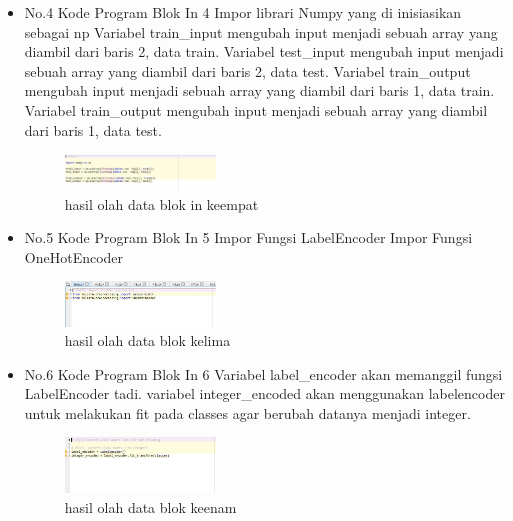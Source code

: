 \begin{enumerate}
\begin{itemize}
        \item  {No.4 Kode Program Blok In 4}
        \subitem  Impor librari Numpy yang di inisiasikan sebagai np
        \subitem  Variabel train\_input mengubah input menjadi sebuah array yang diambil dari baris 2, data train.
        \subitem  Variabel test\_input mengubah input menjadi sebuah array yang diambil dari baris 2, data test.
        \subitem  Variabel train\_output mengubah input menjadi sebuah array yang diambil dari baris 1, data train.
        \subitem  Variabel train\_output mengubah input menjadi sebuah array yang diambil dari baris 1, data test.
        \begin{figure}[H]
            \includegraphics[width=4cm]{figures/1174039/chapter7/praktek4.jpg}
            \centering
            \caption{hasil olah data blok in keempat}
        \end{figure}

        
        \item {No.5 Kode Program Blok In 5}
        \subitem Impor Fungsi LabelEncoder
        \subitem  Impor Fungsi OneHotEncoder
        \begin{figure}[H]
            \includegraphics[width=4cm]{figures/1174039/chapter7/praktek5.jpg}
            \centering
            \caption{hasil olah data blok kelima}
        \end{figure}
        
        \item {No.6 Kode Program Blok In 6}
        \subitem Variabel label\_encoder akan memanggil fungsi LabelEncoder tadi.
        \subitem variabel integer\_encoded akan menggunakan labelencoder untuk melakukan fit pada classes agar berubah datanya menjadi integer.
        \begin{figure}[H]
            \includegraphics[width=4cm]{figures/1174039/chapter7/praktek6.jpg}
            \centering
            \caption{hasil olah data blok keenam}
        \end{figure}
        

\end{itemize}
\end{enumerate}

